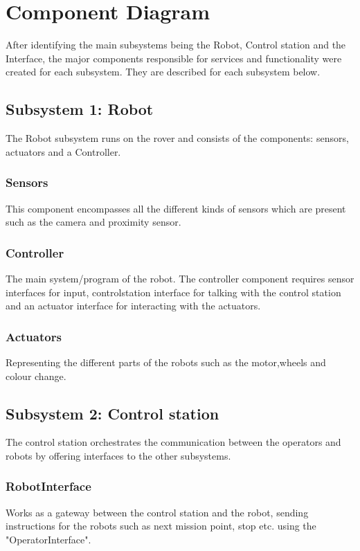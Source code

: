 \section{Component Diagram}
After identifying the main subsystems being the Robot, Control station and the Interface, the major components responsible for services and functionality were created for each subsystem. They are described for each subsystem below.

\subsection*{Subsystem 1: Robot}
The Robot subsystem runs on the rover and consists of the components: sensors, actuators and a Controller.

\subsubsection*{Sensors}
This component encompasses all the different kinds of sensors which are present such as the camera and proximity sensor.

\subsubsection*{Controller}
The main system/program of the robot. The controller component requires sensor interfaces for input, controlstation interface for talking with the control station and an actuator interface for interacting with the actuators.

\subsubsection{Actuators}
Representing the different parts of the robots such as the motor,wheels and colour change.

\subsection*{Subsystem 2: Control station}
The control station orchestrates the communication between the operators and robots by offering interfaces to the other subsystems.

\subsubsection*{RobotInterface}
Works as a gateway between the control station and the robot, sending instructions for the robots such as next mission point, stop etc. using the "OperatorInterface".

